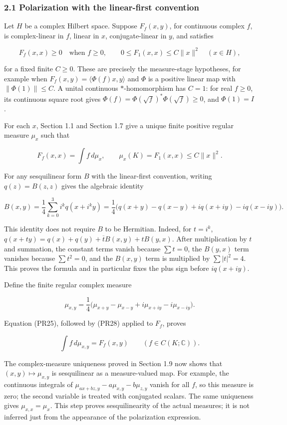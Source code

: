 \documentclass[
  11pt,
]{article}
\begin{document}
\subsubsection{2.1 Polarization with the linear-first
convention}\label{polarization-with-the-linear-first-convention}

Let \(H\) be a complex Hilbert space. Suppose \(F_f(x,y)\), for
continuous complex \(f\), is complex-linear in \(f\), linear in \(x\),
conjugate-linear in \(y\), and satisfies

\[
F_f(x,x)\geq0\quad\text{when }f\geq0,
\qquad
0\leq F_1(x,x)\leq C\|x\|^2
\quad(x\in H),
\tag{PR26}
\]

for a fixed finite \(C\geq0\). These are precisely the measure-stage
hypotheses, for example when \(F_f(x,y)=\langle\Phi(f)x,y\rangle\) and
\(\Phi\) is a positive linear map with \(\|\Phi(1)\|\leq C\). A unital
continuous \(*\)-homomorphism has \(C=1\): for real \(f\geq0\), its
continuous square root gives
\(\Phi(f)=\Phi(\sqrt f)^*\Phi(\sqrt f)\geq0\), and \(\Phi(1)=I\).

For each \(x\), Section 1.1 and Section 1.7 give a unique finite
positive regular measure \(\mu_x\) such that

\[
F_f(x,x)=\int f\,d\mu_x,\qquad
\mu_x(K)=F_1(x,x)\leq C\|x\|^2.
\tag{PR27}
\]

For any sesquilinear form \(B\) with the linear-first convention,
writing \(q(z)=B(z,z)\) gives the algebraic identity

\[
B(x,y)=\frac14\sum_{k=0}^3i^kq(x+i^ky)
=\frac14\bigl(q(x+y)-q(x-y)+i q(x+iy)-i q(x-iy)\bigr).
\tag{PR28}
\]

This identity does not require \(B\) to be Hermitian. Indeed, for
\(t=i^k\), \(q(x+ty)=q(x)+q(y)+\overline t B(x,y)+tB(y,x)\). After
multiplication by \(t\) and summation, the constant terms vanish because
\(\sum t=0\), the \(B(y,x)\) term vanishes because \(\sum t^2=0\), and
the \(B(x,y)\) term is multiplied by \(\sum|t|^2=4\). This proves the
formula and in particular fixes the plus sign before \(i q(x+iy)\).

Define the finite regular complex measure

\[
\mu_{x,y}=\frac14\bigl(\mu_{x+y}-\mu_{x-y}+i\mu_{x+iy}-i\mu_{x-iy}\bigr).
\tag{PR29}
\]

Equation (PR25), followed by (PR28) applied to \(F_f\), proves

\[
\int f\,d\mu_{x,y}=F_f(x,y)\qquad(f\in C(K;\mathbb C)).
\tag{PR30}
\]

The complex-measure uniqueness proved in Section 1.9 now shows that
\((x,y)\mapsto\mu_{x,y}\) is sesquilinear as a measure-valued map. For
example, the continuous integrals of
\(\mu_{ax+bz,y}-a\mu_{x,y}-b\mu_{z,y}\) vanish for all \(f\), so this
measure is zero; the second variable is treated with conjugated scalars.
The same uniqueness gives \(\mu_{x,x}=\mu_x\). This step proves
sesquilinearity of the actual measures; it is not inferred just from the
appearance of the polarization expression.
\end{document}
